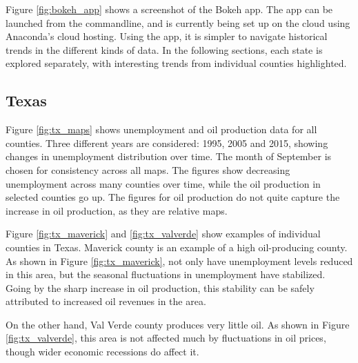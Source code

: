 \documentclass[11pt,letterpaper]{article}
\begin{document}
Figure \ref{fig:bokeh_app} shows a screenshot of the Bokeh app. The app can be launched from the commandline, and is currently being set up on the cloud using Anaconda's cloud hosting. Using the app, it is simpler to navigate historical trends in the different kinds of data. In the following sections, each state is explored separately, with interesting trends from individual counties highlighted.


\subsection{Texas}

Figure \ref{fig:tx_maps} shows unemployment and oil production data for all counties. Three different years are considered: 1995, 2005 and 2015, showing changes in unemployment distribution over time. The month of September is chosen for consistency across all maps. The figures show decreasing unemployment across many counties over time, while the oil production in selected counties go up. The figures for oil production do not quite capture the increase in oil production, as they are relative maps. 

Figure \ref{fig:tx_maverick} and \ref{fig:tx_valverde} show examples of individual counties in Texas. Maverick county is an example of a high oil-producing county. As shown in Figure \ref{fig:tx_maverick}, not only have unemployment levels reduced in this area, but the seasonal fluctuations in unemployment have stabilized. Going by the sharp increase in oil production, this stability can be safely attributed to increased oil revenues in the area.

On the other hand, Val Verde county produces very little oil. As shown in Figure \ref{fig:tx_valverde}, this area is not affected much by fluctuations in oil prices, though wider economic recessions do affect it.
\end{document}
